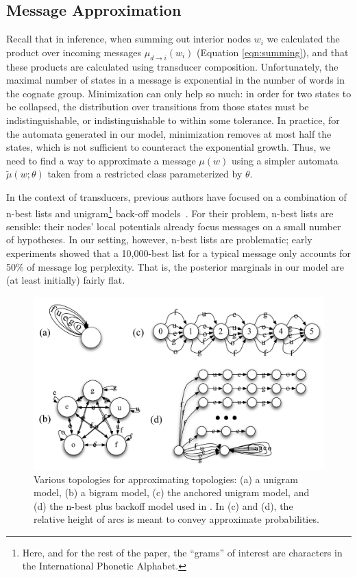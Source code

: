 \documentclass[11pt,a4paper]{article}
\begin{document}
\subsection{Message Approximation}
\label{sec:approx}

Recall that in inference, when summing out interior nodes $w_i$ we
calculated the product over incoming messages $\mu_{d\to i}(w_i)$
(Equation \ref{eqn:summing}), and that these products are calculated
using transducer composition. Unfortunately, the maximal number of
states in a message is exponential in the number of words in the
cognate group. Minimization can only help so much: in order for two
states to be collapsed, the distribution over transitions from those
states must be indistinguishable, or indistinguishable to within
some tolerance. In practice, for the automata generated in our
model, minimization removes at most half the states, which is not
sufficient to counteract the exponential growth. Thus, we need to
find a way to approximate a message $\mu(w)$ using a simpler automata
$\tilde\mu(w;\theta)$ taken from a restricted class parameterized
by $\theta$.

In the context of transducers, previous authors have focused on a
combination of n-best lists and unigram\footnote{Here, and for the
rest of the paper, the ``grams'' of interest are characters in the
International Phonetic Alphabet.} back-off
models~\cite{dreyer2009graphical}.  For their problem, n-best lists
are sensible: their nodes' local potentials already focus messages
on a small number of hypotheses.  In our setting, however, n-best
lists are problematic; early experiments showed that a 10,000-best
list for a typical message only accounts for 50\% of message log
perplexity. That is, the posterior marginals in our model are (at
least initially) fairly flat.

\begin{figure}
  \centering
  \includegraphics[scale=0.3]{fsa}
  \caption{Various topologies for approximating topologies: (a) a
  unigram model, (b) a bigram model, (c) the anchored unigram model,
  and (d) the n-best plus backoff model used in
  . In (c) and (d), the relative height
  of arcs is meant to convey approximate probabilities.}
  \label{fig:fsa}
\end{figure}
\end{document}
